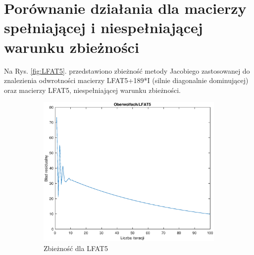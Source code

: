 \documentclass[a4paper,margin=1.54cm]{article}
\begin{document}
\newpage

\section{Porównanie działania dla macierzy spełniającej i niespełniającej warunku zbieżności}

Na Rys. \ref{fig:LFAT5}. przedstawiono zbieżność metody Jacobiego zastosowanej do znalezienia odwrotności macierzy LFAT5+189*I (silnie diagonalnie dominującej) oraz macierzy LFAT5, niespełniającej warunku zbieżności.
\begin{figure}[!ht]
    \centering
    \begin{subfigure}[!ht]{0.45\textwidth}
        \includegraphics[width=\textwidth]{5niezbiega.eps}
        \caption{Zbieżność dla LFAT5}
        \label{fig:5zbiega}
    \end{subfigure}
    ~ %
    \begin{subfigure}[!ht]{0.45\textwidth}

\end{subfigure}
\end{figure}
\end{document}
